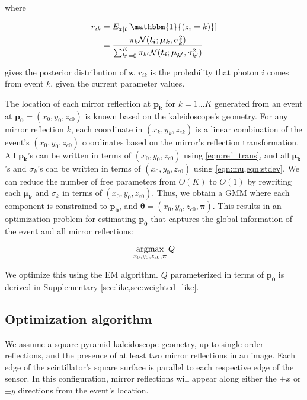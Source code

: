 where 
\begin{linenomath}
\begin{equation} \label{eqn:r_ik}
\begin{aligned}
r_{ik} & = E_{\bm{z}|\bm{t}}[\mathbbm{1}{(z_i=k)}] \\ & = \frac{\pi_k \mathcal{N}(\bm{t_i};\bm{\mu_k},{\sigma_k^2})}{\sum_{k'=0}^K \pi_{k'} \mathcal{N}(\bm{t_i};\bm{\mu_{k'}},{\sigma_{k'}^2})}
\end{aligned}
\end{equation}
\end{linenomath}
gives the posterior distribution of $\bm{z}$.
$r_{ik}$ is the probability that photon $i$ comes from event $k$, given 
the current parameter values.

The location of each mirror reflection at $\bm{p_k}$ for $k=1...K$ generated from 
an event at $\bm{p_0}=(x_0,y_0,z_{c0})$ is known based on the kaleidoscope's geometry.
For any mirror reflection $k$, each coordinate in $(x_k,y_k,z_{ck})$ is a linear 
combination of the event's $(x_0,y_0,z_{c0})$ coordinates based on the mirror's 
reflection transformation.
All $\bm{p_k}$'s can be written in terms of $(x_0,y_0,z_{c0})$ using 
\cref{eqn:ref_trans}, and all $\bm{\mu_k}$'s and $\sigma_k$'s can be written in 
terms of $(x_0,y_0,z_{c0})$ using \cref{eqn:mu,eqn:stdev}.
We can reduce the number of free parameters from $O(K)$ 
to $O(1)$ by rewriting each $\bm{\mu_k}$ and $\sigma_k$ in terms of 
$(x_0,y_0,z_{c0})$.
Thus, we obtain a GMM where each component is constrained to $\bm{p_0}$, and 
$\bm{\theta}=(x_0,y_0,z_{c0},\bm{\pi})$.
This results in an optimization problem for estimating $\bm{p_0}$ that captures 
the global information of the event and all mirror reflections:
\begin{linenomath}
\begin{equation} \label{eqn:opti_prob}
\operatorname*{\arg\!\max}_{x_0,y_0,z_{c0},\bm{\pi}} Q
\end{equation}
\end{linenomath}
We optimize this using the EM algorithm.
$Q$ parameterized in terms of $\bm{p_0}$ is derived in Supplementary \cref*{sec:like,sec:weighted_like}.

\subsection{Optimization algorithm}
We assume a square pyramid kaleidoscope geometry, up to single-order reflections, 
and the presence of at least two mirror reflections in an image.
Each edge of the scintillator's square surface is parallel to each respective edge 
of the sensor.
In this configuration, mirror reflections will appear along either the 
$\pm x$ or $\pm y$ directions from the event's location.

